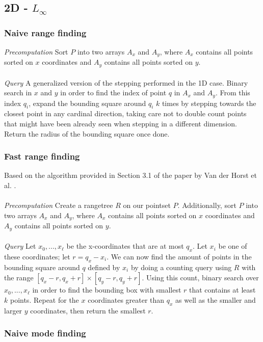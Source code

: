 \documentclass{article}
\begin{document}
\subsection{2D - $L_\infty$}
\subsubsection{Naive range finding}
\textit{Precomputation} Sort $P$ into two arrays $A_x$ and $A_y$, where $A_x$ contains all points sorted on $x$ coordinates and $A_y$ contains all points sorted on $y$. \\\\
\textit{Query} A generalized version of the stepping performed in the 1D case. Binary search in $x$ and $y$ in order to find the index of point $q$ in $A_x$ and $A_y$. From this index $q_i$, expand the bounding square around $q_i$ $k$ times by stepping towards the closest point in any cardinal direction, taking care not to double count points that might have been already seen when stepping in a different dimension. Return the radius of the bounding square once done.
\subsubsection{Fast range finding}
Based on the algorithm provided in Section 3.1 of the paper by Van der Horst et al. \cite{vanderhorst_et_al:LIPIcs.ESA.2022.67}.\\\\
\textit{Precomputation} Create a rangetree $R$ on our pointset $P$. Additionally, sort $P$ into two arrays $A_x$ and $A_y$, where $A_x$ contains all points sorted on $x$ coordinates and $A_y$ contains all points sorted on $y$. \\\\
\textit{Query} Let $x_0, ..., x_\ell$ be the x-coordinates that are at most $q_x$. Let $x_i$ be one of these coordinates; let $r = q_x - x_i$. We can now find the amount of points in the bounding square around $q$ defined by $x_i$ by doing a counting query using $R$ with the range $[q_x - r, q_x + r] \times [q_y - r, q_y + r]$. Using this count, binary search over $x_0, ..., x_\ell$ in order to find the bounding box with smallest $r$ that contains at least $k$ points. Repeat for the $x$ coordinates greater than $q_x$ as well as the smaller and larger $y$ coordinates, then return the smallest $r$.
\subsubsection{Naive mode finding}
\end{document}
